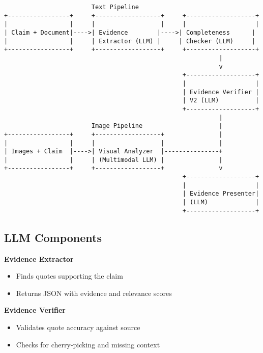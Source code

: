 \documentclass[11pt]{article}
\begin{document}
\newpage
\begin{verbatim}
                        Text Pipeline
+-----------------+     +------------------+     +-------------------+
|                 |     |                  |     |                   |
| Claim + Document|---->| Evidence        |---->| Completeness      |
|                 |     | Extractor (LLM) |     | Checker (LLM)     |
+-----------------+     +------------------+     +-------------------+
                                                           |
                                                           v
                                                 +-------------------+
                                                 |                   |
                                                 | Evidence Verifier |
                                                 | V2 (LLM)          |
                                                 +-------------------+
                                                           |
                        Image Pipeline                     |
+-----------------+     +------------------+               |
|                 |     |                  |               |
| Images + Claim  |---->| Visual Analyzer  |---------------+
|                 |     | (Multimodal LLM) |               |
+-----------------+     +------------------+               v
                                                 +-------------------+
                                                 |                   |
                                                 | Evidence Presenter|
                                                 | (LLM)             |
                                                 +-------------------+
\end{verbatim}

\subsection{LLM Components}

\textbf{Evidence Extractor}
\begin{itemize}
\item Finds quotes supporting the claim
\item Returns JSON with evidence and relevance scores
\end{itemize}

\textbf{Evidence Verifier}
\begin{itemize}
\item Validates quote accuracy against source
\item Checks for cherry-picking and missing context
\end{itemize}
\end{document}
